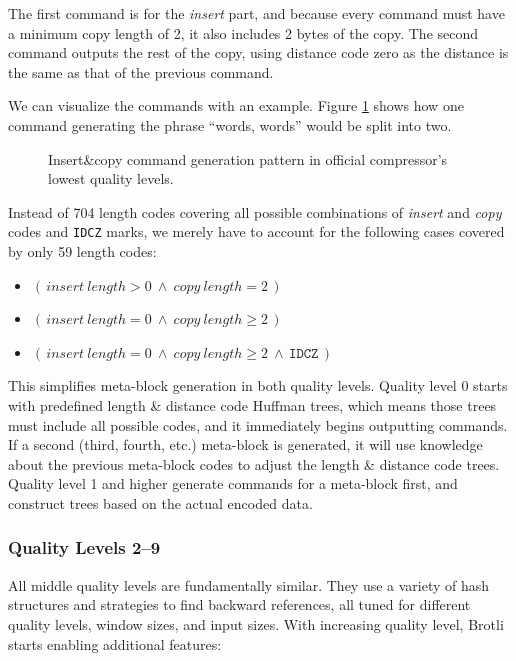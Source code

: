 \documentclass[english,master,dept460,male,cpp,cpdeclaration]{diploma}
\newcommand{\nosep}{\itemsep0em}
\newcommand{\texfigure}[1]{
}
\begin{document}
		The first command is for the \emph{insert} part, and because every command must have a minimum copy length of 2, it also includes 2 bytes of the copy. The second command outputs the rest of the copy, using distance code zero as the distance is the same as that of the previous command.
		
		We can visualize the commands with an example. Figure \ref{fig:quality-0-1-command-generation-example} shows how one command generating the phrase \enquote{words, words} would be split into two.
		
		\begin{figure}[H]
			\medskip
			\texfigure{quality-0-1-command-generation-example}
			\caption{Insert\&copy command generation pattern in official compressor's lowest quality levels.}
			\label{fig:quality-0-1-command-generation-example}
		\end{figure}
		
		\noindent
		Instead of 704 length codes covering all possible combinations of \emph{insert} and \emph{copy} codes and \verb|IDCZ| marks, we merely have to account for the following cases covered by only 59 length codes:
		
		\begin{itemize} \nosep
			\item $(\,insert\ length > 0\ \wedge\ copy\ length = 2\,)$
			\item $(\,insert\ length = 0\ \wedge\ copy\ length \geq 2\,)$
			\item $(\,insert\ length = 0\ \wedge\ copy\ length \geq 2\ \wedge\,\mathtt{IDCZ}\,)$
		\end{itemize}
		
		\noindent
		This simplifies meta-block generation in both quality levels. Quality level 0 starts with predefined length \& distance code Huffman trees, which means those trees must include all possible codes, and it immediately begins outputting commands. If a second (third, fourth, etc.) meta-block is generated, it will use knowledge about the previous meta-block codes to adjust the length \& distance code trees. Quality level 1 and higher generate commands for a meta-block first, and construct trees based on the actual encoded data.
		
		\subsubsection{Quality Levels 2--9}
		
		All middle quality levels are fundamentally similar. They use a variety of hash structures and strategies to find backward references, all tuned for different quality levels, window sizes, and input sizes. With increasing quality level, Brotli starts enabling additional features:
		
\end{document}
